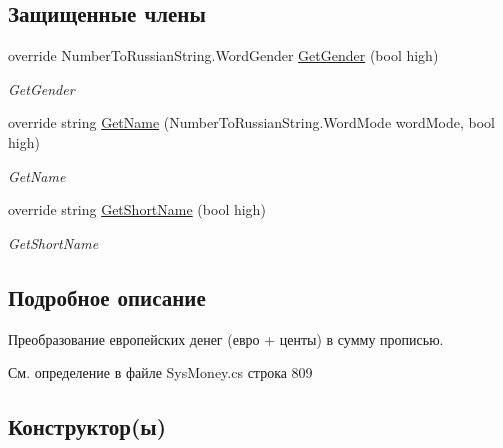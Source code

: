 \subsection*{Защищенные члены}
\begin{DoxyCompactItemize}
\item 
override Number\+To\+Russian\+String.\+Word\+Gender \mbox{\hyperlink{class_f_b_a_1_1_euro_to_string_provider_aa2224b2f6f00b6f980ab4022b1db688c}{Get\+Gender}} (bool high)
\begin{DoxyCompactList}\small\item\em Get\+Gender \end{DoxyCompactList}\item 
override string \mbox{\hyperlink{class_f_b_a_1_1_euro_to_string_provider_a6b40c1dc54b209d90c3440b0c76b5bbe}{Get\+Name}} (Number\+To\+Russian\+String.\+Word\+Mode word\+Mode, bool high)
\begin{DoxyCompactList}\small\item\em Get\+Name \end{DoxyCompactList}\item 
override string \mbox{\hyperlink{class_f_b_a_1_1_euro_to_string_provider_a86d24c3da503faee3603d111a65228ea}{Get\+Short\+Name}} (bool high)
\begin{DoxyCompactList}\small\item\em Get\+Short\+Name \end{DoxyCompactList}\end{DoxyCompactItemize}


\subsection{Подробное описание}
Преобразование европейских денег (евро + центы) в сумму прописью. 



См. определение в файле Sys\+Money.\+cs строка 809



\subsection{Конструктор(ы)}
\mbox{\label{class_f_b_a_1_1_euro_to_string_provider_a95489fa13c5f7b398c0e7f76c2934133}} 
